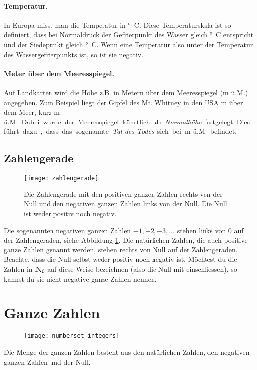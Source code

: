 \paragraph{Temperatur.}
In Europa misst man die Temperatur in \unit{°C}.
Diese Temperaturskala ist so definiert, dass bei Normaldruck der Gefrierpunkt des Wasser gleich \unit[0]{°C} entspricht und der Siedepunkt gleich \unit[100]{°C}.
Wenn eine Temperatur also unter der Temperatur des Wassergefrierpunkts ist, so ist sie negativ.

\paragraph{Meter über dem Meeresspiegel.}
Auf Landkarten wird die Höhe z.B. in Metern über dem Meeresspiegel (m ü.M.) angegeben.
Zum Beispiel liegt der Gipfel des Mt. Whitney in den USA \unit[4418]{m} über dem Meer, kurz \unit[4418]{m ü.M.}
Dabei wurde der Meeresspiegel künstlich als \emph{Normalhöhe} festgelegt.
Dies führt dazu, dass das sogenannte \emph{Tal des Todes} sich bei \unit[-86]{m ü.M.} befindet.

\subsection{Zahlengerade}
\begin{figure}[H]
	\texttt{[image: zahlengerade]}
	\caption{Die Zahlengerade mit den positiven ganzen Zahlen rechts von der Null und den negativen ganzen Zahlen links von der Null.
	Die Null ist weder positiv noch negativ.}
	\label{fig:zahlengerade-pos-neg}
\end{figure}

Die sogenannten negativen ganzen Zahlen $-1, -2, -3, \ldots$ stehen links von 0 auf der Zahlengeraden, siehe Abbildung \ref{fig:zahlengerade-pos-neg}.
Die natürlichen Zahlen, die auch positive ganze Zahlen genannt werden, stehen rechts von Null auf der Zahlengeraden. Beachte, dass die Null selbst weder positiv noch negativ ist.
Möchtest du die Zahlen in $\mathbb{N}_0$ auf diese Weise bezeichnen (also die Null mit einschliessen), so kannst du sie nicht-negative ganze Zahlen nennen.

\section{Ganze Zahlen}
\begin{wrapfigure}{r}{7cm}
	\vspace{-1cm}
	\texttt{[image: numberset-integers]}
	\vspace{-2cm}
\end{wrapfigure}
Die Menge der ganzen Zahlen besteht aus den natürlichen Zahlen, den negativen ganzen Zahlen und der Null.


